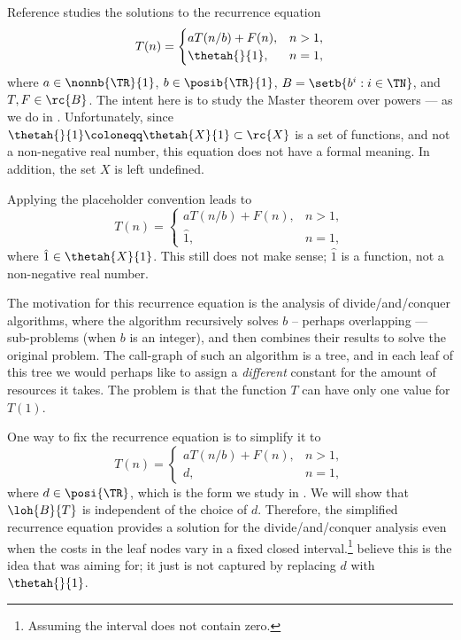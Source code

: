 \documentclass[b5paper, english, oneside]{memoir}
\begin{document}
\begin{example}
Reference \cite[page 102]{IntroAlgo2009} studies the solutions to the recurrence equation
\begin{equation}
T(n) = 
\begin{cases}
a T(n / b) + F(n), & n > 1, \\
\thetah{}{1}, & n = 1, 
\end{cases}
\end{equation}
where $a \in \nonnb{\TR}{1}$, $b \in \posib{\TR}{1}$, $B = \setb{b^i : i \in \TN}$, and $T, F \in \rc{B}$. The intent here is to study the Master theorem over powers --- as we do in . Unfortunately, since $\thetah{}{1} \coloneqq \thetah{X}{1} \subset \rc{X}$ is a set of functions, and not a non-negative real number, this equation does not have a formal meaning. In addition, the set $X$ is left undefined. 

Applying the placeholder convention leads to
\begin{equation}
T(n) = 
\begin{cases}
a T(n / b) + F(n), & n > 1, \\
\hat{1}, & n = 1,
\end{cases}
\end{equation}
where $\hat{1} \in \thetah{X}{1}$. This still does not make sense; $\hat{1}$ is a function, not a non-negative real number.

The motivation for this recurrence equation is the analysis of divide\-/and\-/conquer algorithms, where the algorithm recursively solves $b$ -- perhaps overlapping --- sub-problems (when $b$ is an integer), and then combines their results to solve the original problem. The call-graph of such an algorithm is a tree, and in each leaf of this tree we would perhaps like to assign a \emph{different} constant for the amount of resources it takes. The problem is that the function $T$ can have only one value for $T(1)$.

One way to fix the recurrence equation is to simplify it to
\begin{equation}
T(n) = 
\begin{cases}
a T(n / b) + F(n), & n > 1, \\
d, & n = 1,
\end{cases}
\end{equation}
where $d \in \posi{\TR}$, which is the form we study in . We will show that $\loh{B}{T}$ is independent of the choice of $d$. Therefore, the simplified recurrence equation provides a solution for the divide\-/and\-/conquer analysis even when the costs in the leaf nodes vary in a fixed closed interval.\footnote{Assuming the interval does not contain zero.} \We{} believe this is the idea that \cite{IntroAlgo2009} was aiming for; it just is not captured by replacing $d$ with $\thetah{}{1}$.
\end{example}
\end{document}
